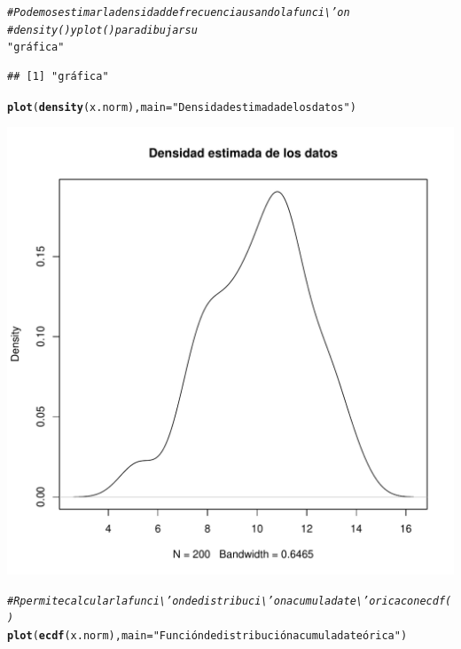 \documentclass[12pt,letterpaper]{article}\usepackage[]{graphicx}\usepackage[]{color}
\makeatletter
\def\maxwidth{ %
  \ifdim\Gin@nat@width>\linewidth
    \linewidth
  \else
    \Gin@nat@width
  \fi
}
\newcommand{\hlstr}[1]{\textcolor[rgb]{0.192,0.494,0.8}{#1}}%
\newcommand{\hlcom}[1]{\textcolor[rgb]{0.678,0.584,0.686}{\textit{#1}}}%
\newcommand{\hlstd}[1]{\textcolor[rgb]{0.345,0.345,0.345}{#1}}%
\newcommand{\hlkwc}[1]{\textcolor[rgb]{0.333,0.667,0.333}{#1}}%
\newcommand{\hlkwd}[1]{\textcolor[rgb]{0.737,0.353,0.396}{\textbf{#1}}}%
\newenvironment{kframe}{%
 \def\at@end@of@kframe{}%
 \ifinner\ifhmode%
  \def\at@end@of@kframe{\end{minipage}}%
  \begin{minipage}{\columnwidth}%
 \fi\fi%
 \def\FrameCommand##1{\hskip\@totalleftmargin \hskip-\fboxsep
 \colorbox{shadecolor}{##1}\hskip-\fboxsep
     \hskip-\linewidth \hskip-\@totalleftmargin \hskip\columnwidth}%
 \MakeFramed {\advance\hsize-\width
   \@totalleftmargin\z@ \linewidth\hsize
   \@setminipage}}%
 {\par\unskip\endMakeFramed%
 \at@end@of@kframe}
\newenvironment{knitrout}{}{} %
\makeatother
\begin{document}
\begin{knitrout}
\begin{kframe}\begin{alltt}
\hlcom{# Podemos estimar la densidad de frecuencia usando la funci\textbackslash{}'on }
\hlcom{# density() y plot() para dibujar su }
\hlstr{"gráfica"}
\end{alltt}
\begin{verbatim}
## [1] "gráfica"
\end{verbatim}
\begin{alltt}
\hlkwd{plot}\hlstd{(}\hlkwd{density}\hlstd{(x.norm),} \hlkwc{main}\hlstd{=}\hlstr{"Densidad estimada de los datos"}\hlstd{)}
\end{alltt}
\end{kframe}
\includegraphics[width=\maxwidth]{figure/unnamed-chunk-16-2} 
\begin{kframe}\begin{alltt}
\hlcom{# R permite calcular la funci\textbackslash{}'on de distribuci\textbackslash{}'on acumulada te\textbackslash{}'orica con ecdf() }
\hlkwd{plot}\hlstd{(}\hlkwd{ecdf}\hlstd{(x.norm),}\hlkwc{main}\hlstd{=}\hlstr{"Función de distribución acumulada teórica"}\hlstd{)}
\end{alltt}
\end{kframe}

\end{knitrout}
\end{document}

